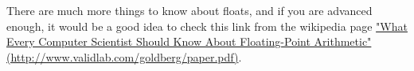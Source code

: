 \documentclass[a4paper,10pt,twoside]{book}
\begin{document}
%
%
%
%
%
%
%
%
%
%



There are much more things to know about floats, and if you are advanced enough, it would be a good idea to check this link from the wikipedia page \href{http://www.validlab.com/goldberg/paper.pdf}{"What Every Computer Scientist Should Know About Floating-Point Arithmetic" (http://www.validlab.com/goldberg/paper.pdf)}.


\ifx\wholebook\relax\else
   
   
\end{document}
